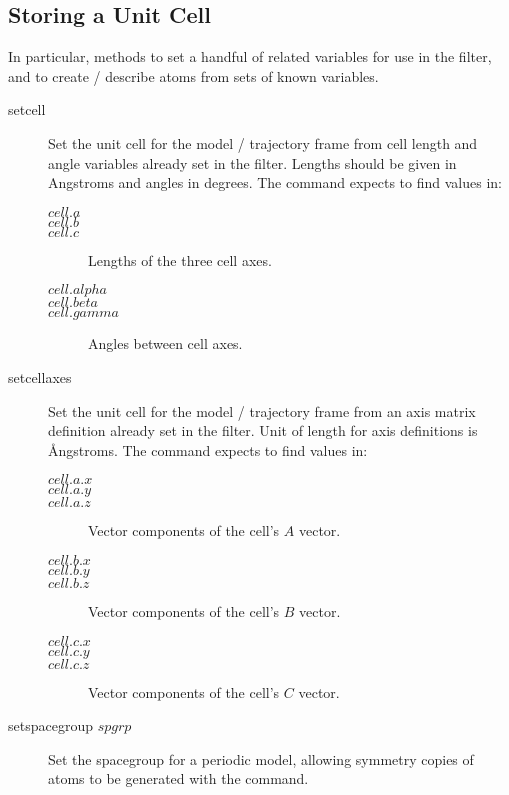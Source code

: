 \subsection{Storing a Unit Cell}
In particular, methods to set a handful of related variables for use in the filter, and to create / describe atoms from sets of known variables.\\
\begin{description}

	\item[setcell\its]
	Set the unit cell for the model / trajectory frame from cell length and angle variables already set in the filter. Lengths should be given in Angstroms and angles in degrees. The command expects to find values in:
	\begin{description}
		\item[$cell.a$]
		\item[$cell.b$]
		\item[$cell.c$\its]
			Lengths of the three cell axes.
		\item[$cell.alpha$]
		\item[$cell.beta$]
		\item[$cell.gamma$\its]
			Angles between cell axes.
	\end{description}

	\item[setcellaxes\its]
	Set the unit cell for the model / trajectory frame from an axis matrix definition already set in the filter. Unit of length for axis definitions is \AA{}ngstroms. The command expects to find values in:
	\begin{description}
		\item[$cell.a.x$]
		\item[$cell.a.y$]
		\item[$cell.a.z$\its]
			Vector components of the cell's $A$ vector.
		\item[$cell.b.x$]
		\item[$cell.b.y$]
		\item[$cell.b.z$\its]
			Vector components of the cell's $B$ vector.
		\item[$cell.c.x$]
		\item[$cell.c.y$]
		\item[$cell.c.z$\its]
			Vector components of the cell's $C$ vector.
	\end{description}

	\item[setspacegroup $spgrp$\its]
	Set the spacegroup for a periodic model, allowing symmetry copies of atoms to be generated with the  command.

\end{description}


